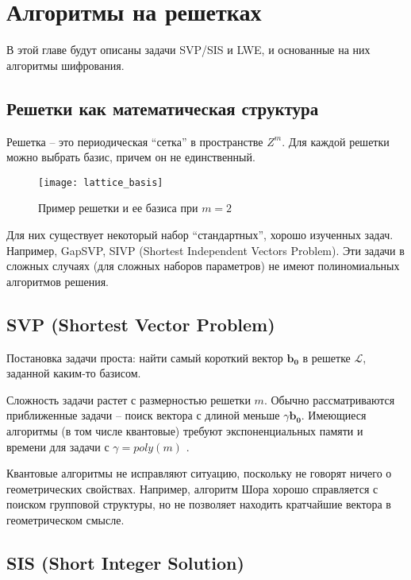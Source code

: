 \chapter{Алгоритмы на решетках}
\label{ch:chap2}

В этой главе будут описаны задачи SVP/SIS и LWE, и основанные на них алгоритмы шифрования.

\section{Решетки как математическая структура}
\label{sec:lattice_math}

Решетка -- это периодическая ``сетка'' в пространстве $Z^m$.
Для каждой решетки можно выбрать базис, причем он не единственный.

\begin{figure}[ht]
	\centering
	\texttt{[image: lattice\_basis]}
	\caption{Пример решетки и ее базиса при $m = 2$}
	\label{fig:lattice_basis}
\end{figure}

Для них существует некоторый набор ``стандартных'', хорошо изученных задач. Например, GapSVP, SIVP (Shortest Independent Vectors Problem). Эти задачи в сложных случаях (для сложных наборов параметров) не имеют полиномиальных алгоритмов решения.

\section{SVP (Shortest Vector Problem)}

Постановка задачи проста: найти самый короткий вектор $\bm{b_0}$ в решетке $\mathcal{L}$, заданной каким-то базисом.

Сложность задачи растет с размерностью решетки $m$. Обычно рассматриваются приближенные задачи -- поиск вектора с длиной меньше $\gamma \boldsymbol{b_0}$. Имеющиеся алгоритмы (в том числе квантовые) требуют экспоненциальных памяти и времени для задачи с $\gamma = poly(m)$ \cite{svp}.

Квантовые алгоритмы не исправляют ситуацию, поскольку не говорят ничего о геометрических свойствах. Например, алгоритм Шора хорошо справляется с поиском групповой структуры, но не позволяет находить кратчайшие вектора в геометрическом смысле.

\section{SIS (Short Integer Solution)}


